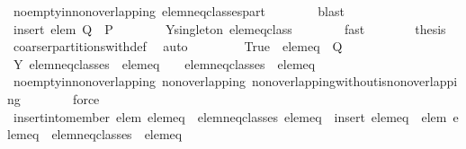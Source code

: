 \begin{isabellebody}
\ no{\isacharunderscore}empty{\isacharunderscore}in{\isacharunderscore}non{\isacharunderscore}overlapping\ elem{\isacharunderscore}neq{\isacharunderscore}classes{\isacharunderscore}part\isanewline
\ \ \ \ \ \ \isamarkupfalse%
\ blast\isanewline
\ \ \ \ \isamarkupfalse%
\ \isamarkupfalse%
\ {\isachardoublequoteopen}insert\ {\isacharbraceleft}elem{\isacharbraceright}\ {\isacharquery}Q\ {\isacharequal}\ P{\isachardoublequoteclose}\isanewline
\ \ \ \ \ \ \isamarkupfalse%
\ Y{\isacharunderscore}singleton\ elem{\isacharunderscore}eq{\isacharunderscore}class{\isacharprime}\isanewline
\ \ \ \ \ \ \isamarkupfalse%
\ fast\isanewline
\ \ \ \ \isamarkupfalse%
\ \isamarkupfalse%
\ {\isacharquery}thesis\ \isamarkupfalse%
\ coarser{\isacharunderscore}partitions{\isacharunderscore}with{\isacharunderscore}def\ \isamarkupfalse%
\ auto\isanewline
\ \ \isamarkupfalse%
\isanewline
\ \ \ \ \isamarkupfalse%
\ True{\isacharcolon}\ {\isachardoublequoteopen}{\isasymnot}\ {\isacharquery}elem{\isacharunderscore}eq\ {\isasymnotin}\ {\isacharquery}Q{\isachardoublequoteclose}\isanewline
\ \ \ \ \isamarkupfalse%
\ Y{\isacharprime}{\isacharcolon}\ {\isachardoublequoteopen}{\isacharquery}elem{\isacharunderscore}neq{\isacharunderscore}classes\ {\isasymunion}\ {\isacharbraceleft}{\isacharquery}elem{\isacharunderscore}eq{\isacharbraceright}\ {\isacharminus}\ {\isacharbraceleft}{\isacharbraceleft}{\isacharbraceright}{\isacharbraceright}\ {\isacharequal}\ {\isacharquery}elem{\isacharunderscore}neq{\isacharunderscore}classes\ {\isasymunion}\ {\isacharbraceleft}{\isacharquery}elem{\isacharunderscore}eq{\isacharbraceright}{\isachardoublequoteclose}\isanewline
\ \ \ \ \ \ \isamarkupfalse%
\ no{\isacharunderscore}empty{\isacharunderscore}in{\isacharunderscore}non{\isacharunderscore}overlapping\ non{\isacharunderscore}overlapping\ non{\isacharunderscore}overlapping{\isacharunderscore}without{\isacharunderscore}is{\isacharunderscore}non{\isacharunderscore}overlapping\isanewline
\ \ \ \ \ \ \isamarkupfalse%
\ force\isanewline
\ \ \ \ \isamarkupfalse%
\ {\isachardoublequoteopen}insert{\isacharunderscore}into{\isacharunderscore}member\ elem\ {\isacharparenleft}{\isacharbraceleft}{\isacharquery}elem{\isacharunderscore}eq{\isacharbraceright}\ {\isasymunion}\ {\isacharquery}elem{\isacharunderscore}neq{\isacharunderscore}classes{\isacharparenright}\ {\isacharquery}elem{\isacharunderscore}eq\ {\isacharequal}\ insert\ {\isacharparenleft}{\isacharquery}elem{\isacharunderscore}eq\ {\isasymunion}\ {\isacharbraceleft}elem{\isacharbraceright}{\isacharparenright}\ {\isacharparenleft}{\isacharparenleft}{\isacharbraceleft}{\isacharquery}elem{\isacharunderscore}eq{\isacharbraceright}\ {\isasymunion}\ {\isacharquery}elem{\isacharunderscore}neq{\isacharunderscore}classes{\isacharparenright}\ {\isacharminus}\ {\isacharbraceleft}{\isacharquery}elem{\isacharunderscore}eq{\isacharbraceright}{\isacharparenright}{\isachardoublequoteclose}\isanewline

\end{isabellebody}
